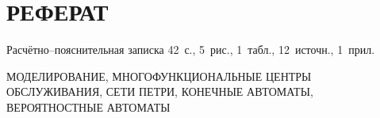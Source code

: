 \chapter*{РЕФЕРАТ}

Расчётно--пояснительная записка 42~с., 5~рис., 1~табл., 12~источн., 1~прил.

\noindent\MakeUppercase{моделирование, многофункциональные центры обслуживания, сети петри, конечные автоматы, вероятностные автоматы}



\setcounter{page}{3}